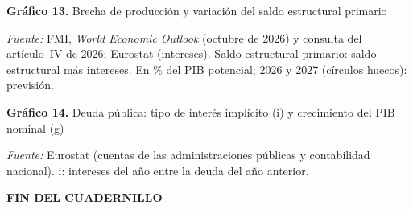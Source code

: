 \documentclass[11pt,a4paper]{article}
\newlength{\altograf}\setlength{\altograf}{5.6cm}
\newenvironment{bloquecuadro}{\par\noindent\begingroup\scriptsize\setlength{\tabcolsep}{1.6pt}\renewcommand{\arraystretch}{1.08}}{\endgroup\par}
\newcommand{\grafico}[4]{%
  \begin{minipage}[t]{0.495\linewidth}\centering
    {\small\textbf{Gráfico #1.} #2\par}\vspace{1pt}
    \par\vspace{-2pt}
    \begin{minipage}{0.95\linewidth}\raggedright\tiny\textit{Fuente:} #3\end{minipage}
  \end{minipage}}
\begin{document}
\begin{bloquecuadro}\end{bloquecuadro}
\vspace{8pt}\noindent\setlength{\altograf}{5.6cm}
\grafico{13}{Brecha de producción y variación del saldo estructural primario}{FMI, \textit{World Economic Outlook} (octubre de 2026) y consulta del artículo~IV de 2026; Eurostat (intereses). Saldo estructural primario: saldo estructural más intereses. En \% del PIB potencial; 2026 y 2027 (círculos huecos): previsión.}{g13-orientacion-fiscal}\hfill
\grafico{14}{Deuda pública: tipo de interés implícito (i) y crecimiento del PIB nominal (g)}{Eurostat (cuentas de las administraciones públicas y contabilidad nacional). i: intereses del año entre la deuda del año anterior.}{g14-deuda-i-g}

\vspace{14pt}
\begin{center}\textbf{FIN DEL CUADERNILLO}\end{center}
\end{document}
